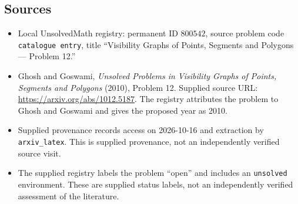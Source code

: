 \documentclass[11pt]{article}
\begin{document}
\subsection{Sources}
\begin{itemize}
\item Local UnsolvedMath registry: permanent ID \(800542\), source problem code \texttt{catalogue entry}, title ``Visibility Graphs of Points, Segments and Polygons --- Problem 12.''
\item Ghosh and Goswami, \emph{Unsolved Problems in Visibility Graphs of Points, Segments and Polygons} (2010), Problem 12. Supplied source URL: \url{https://arxiv.org/abs/1012.5187}. The registry attributes the problem to Ghosh and Goswami and gives the proposed year as 2010.
\item Supplied provenance records access on 2026-10-16 and extraction by \texttt{arxiv\_latex}. This is supplied provenance, not an independently verified source visit.
\item The supplied registry labels the problem ``open'' and includes an \texttt{unsolved} environment. These are supplied status labels, not an independently verified assessment of the literature.
\end{itemize}
\end{document}
